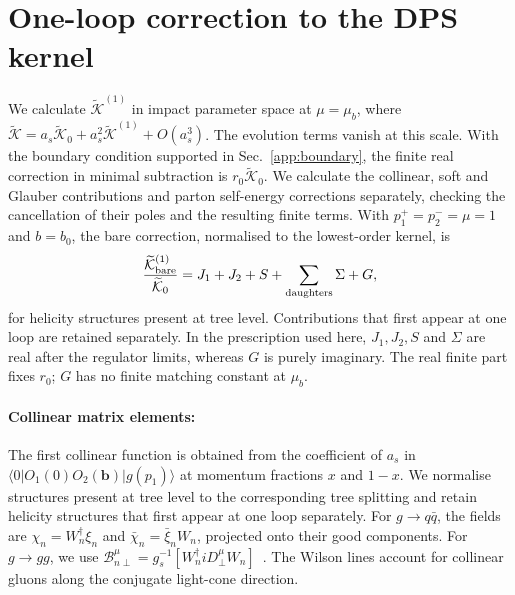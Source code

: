\documentclass[%
 onecolumn,
 superscriptaddress,
 preprintnumbers,
 nofootinbib,
 amsmath,amssymb,
 aps,
 prl,
]{revtex4-2}
\newcommand{\bb}{\boldsymbol b}
\begin{document}
\section{One-loop correction to the DPS kernel}\label{app:regions}

We calculate $\widetilde{\mathcal K}^{(1)}$ in impact parameter space at
$\mu=\mu_b$, where
$\widetilde{\mathcal K}=a_s\widetilde{\mathcal K}_0+
 a_s^2\widetilde{\mathcal K}^{(1)}+O(a_s^3)$.
The evolution terms vanish at this scale. With the boundary condition
supported in Sec.~\ref{app:boundary}, the finite real correction in
minimal subtraction is $r_0\widetilde{\mathcal K}_0$.
We calculate the collinear, soft and Glauber contributions and
parton self-energy corrections separately, checking the cancellation of their poles
and the resulting finite terms. With $p_1^+=p_2^-=\mu=1$ and $b=b_0$,
the bare correction, normalised to the lowest-order kernel, is
\begin{equation}
\dfrac{\widetilde{\mathcal K}^{(1)}_{\rm bare}}{\widetilde{\mathcal K}_0}=J_1+J_2+S+\sum_{\rm daughters}\Sigma+G,
\label{eq:Kregions}
\end{equation}
for helicity structures present at tree level. Contributions that
first appear at one loop are retained separately. In the prescription
used here, $J_1,J_2,S$ and $\Sigma$ are real after the regulator
limits, whereas $G$ is purely imaginary. The real finite part
fixes $r_0$; $G$ has no finite matching constant at $\mu_b$.

\paragraph{Collinear matrix elements: }
The first collinear function is obtained from the coefficient of
$a_s$ in $\langle0|O_1(0)O_2(\bb)|g(p_1)\rangle$ at momentum
fractions $x$ and $1-x$. We normalise structures present at tree
level to the corresponding tree splitting and retain helicity
structures that first appear at one loop separately.
For $g\to q\bar q$, the fields are
$\chi_n=W_n^\dagger\xi_n$ and
$\bar\chi_n=\bar\xi_nW_n$, projected onto their good components.
For $g\to gg$, we use
$\mathcal B_{n\perp}^\mu=g_s^{-1}[W_n^\dagger iD_\perp^\mu W_n]$~\cite{Bauer:2002nz}. The Wilson lines account for collinear
gluons along the conjugate light-cone direction.
\end{document}
